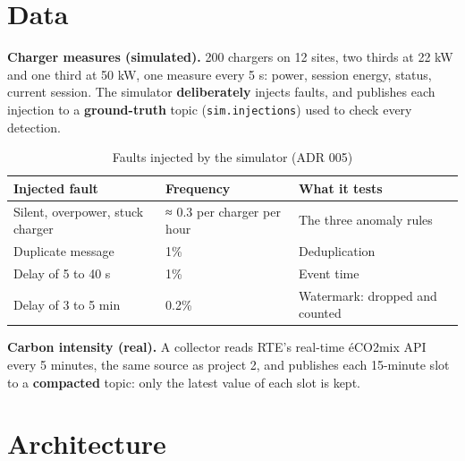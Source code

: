 \documentclass[11pt, a4paper, oneside, headings=normal, numbers=noenddot, DIV=12]{scrartcl}
\begin{document}
\section{Data}

\textbf{Charger measures (simulated).} 200 chargers on 12 sites, two thirds at 22 kW and one third at 50 kW, one measure every 5 s: power,
session energy, status, current session. The simulator \textbf{deliberately} injects faults, and publishes each injection to a
\textbf{ground-truth} topic (\texttt{sim.injections}) used to check every detection.

\begin{table}[H]
\centering\small
\begin{tabularx}{\linewidth}{@{}L{4.4cm} L{3.2cm} Y@{}}
\toprule
\textbf{Injected fault} & \textbf{Frequency} & \textbf{What it tests} \\
\midrule
Silent, overpower, stuck charger & ≈ 0.3 per charger per hour & The three anomaly rules \\
Duplicate message & 1\% & Deduplication \\
Delay of 5 to 40 s & 1\% & Event time \\
Delay of 3 to 5 min & 0.2\% & Watermark: dropped and counted \\
\bottomrule
\end{tabularx}
\caption{Faults injected by the simulator (ADR 005)}
\end{table}

\textbf{Carbon intensity (real).} A collector reads RTE's real-time éCO2mix API every 5 minutes, the same source as project 2, and publishes
each 15-minute slot to a \textbf{compacted} topic: only the latest value of each slot is kept.

\section{Architecture}
\end{document}
